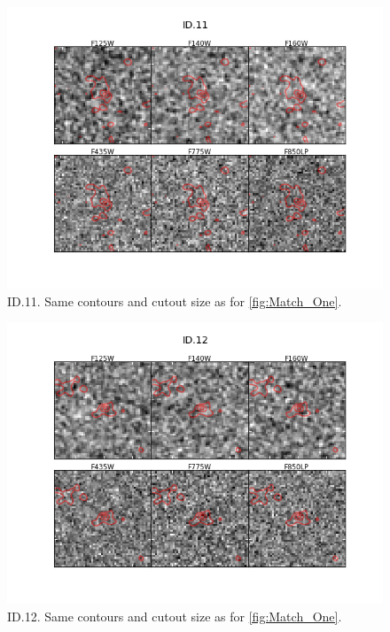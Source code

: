 \begin{figure}[tbp]
\centering \includegraphics[width=160mm]{Matched/ASPECS_Cutout_10.png}
\caption{ID.11. Same contours and cutout size as for \ref{fig:Match_One}.}
\label{fig:Match_Three}
\end{figure}

\begin{figure}[tbp]
\centering \includegraphics[width=160mm]{Matched/ASPECS_Cutout_11.png}
\caption{ID.12. Same contours and cutout size as for \ref{fig:Match_One}.}
\label{fig:Match_Three}
\end{figure}

